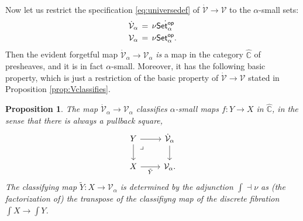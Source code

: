 \documentclass[11pt]{article}
\newcommand{\C}{\ensuremath{\mathbb{C}}}
\newcommand{\Set}{\ensuremath{\mathsf{Set}}}
\newcommand{\hook}{\ensuremath{\hookrightarrow}}
\renewcommand{\to}{\ensuremath{\rightarrow}}
\newcommand{\SSet}{\ensuremath{\,\dot{\Set}}}
\newcommand{\V}{\ensuremath{\mathcal{V}}}
\newcommand{\VV}{\ensuremath{\dot{\mathcal{V}}}}
\newcommand{\elem}[1]{\textstyle\int\!{#1}}
\newcommand{\pbmark}{\ar[dr, phantom, "\lrcorner" very near start, shift right=.5ex]}	%
\newtheorem{proposition}[theorem]{Proposition}
\theoremstyle{remark}
\theoremstyle{definition}
\begin{document}

Now let us restrict the specification \eqref{eq:universedef} of $\VV\to\V$ to the $\alpha$-small sets:
\begin{align}\label{eq:universedefalpha}\textstyle
\VV_\alpha\, &=\, \nu \dot{\Set^{\mathsf{op}}_\alpha}\\  
\V_\alpha\, &=\, \nu \Set^{\mathsf{op}}_\alpha. \notag
 \end{align}
Then the evident forgetful map $\VV_\alpha\to\V_\alpha$ \emph{is} a map in the category $\widehat{\C}$ of presheaves, and it is in fact $\alpha$-small. Moreover, it has the following basic property, which is just a restriction of the basic property of $\VV\to\V$ stated in Proposition \ref{prop:Vclassifies}.

 \begin{proposition}\label{prop:Valphaclassifies}
The map $\VV_\alpha\to\V_\alpha$ classifies $\alpha$-small maps $f:Y\to X$ in $\widehat{\C}$, in the sense that there is always a pullback square,
\begin{equation}\label{eq:classifyuniversefamilyalpha}\textstyle
\begin{tikzcd}
	 Y \ar[d] \pbmark \ar[r] & \VV_\alpha \ar[d] \\  
	X \ar[r,swap, "\tilde{Y}"] &  \V_\alpha.
 \end{tikzcd}
 \end{equation}
The classifying map $\tilde{Y} : X\to \V_\alpha$ is determined by the adjunction $\int \dashv \nu$ as (the factorization of) the transpose of the classifiyng map of the discrete fibration $\elem X\to\elem Y$. 
\end{proposition}
\end{document}
